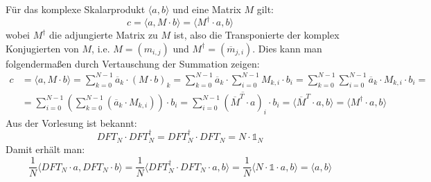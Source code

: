 \begin{flushenum}
	\item Für das komplexe Skalarprodukt $\langle a, b\rangle$ und eine
	Matrix $M$ gilt:
	\[ c = \langle a, M \cdot b\rangle = \langle M^\dagger \cdot a, b\rangle \]
	wobei $M^\dagger$ die adjungierte Matrix zu $M$ ist, also die Transponierte der komplex Konjugierten von $M$,
	i.e. $M = (m_{i,j})$ und $M^\dagger = (\overline{m}_{j,i})$.
	Dies kann man folgendermaßen durch Vertauschung der Summation zeigen:
	\begin{equation*}
	\begin{split}
	c &= \langle a, M \cdot b\rangle = \sum_{k=0}^{N-1} \overline{a}_k \cdot \left( M \cdot b \right)_k =
	\sum_{k=0}^{N-1} \overline{a}_k \cdot \sum_{i=0}^{N-1} M_{k,i} \cdot b_i =
	\sum_{k=0}^{N-1} \sum_{i=0}^{N-1} \overline{a}_k \cdot M_{k,i} \cdot b_i = \\
	&= \sum_{i=0}^{N-1} \left( \sum_{k=0}^{N-1} \left( \overline{a}_k \cdot M_{k,i}\right) \right) \cdot b_i =
	\sum_{i=0}^{N-1} \overline{\left( \overline{M}^T \cdot a \right)}_i
	\cdot b_i = \langle\overline{M}^T \cdot a, b\rangle = \langle M^\dagger
	\cdot a, b\rangle
	\end{split}
	\end{equation*}
	Aus der Vorlesung ist bekannt: 
	\[ DFT_N \cdot DFT_N^\dagger = DFT_N^\dagger \cdot DFT_N = N \cdot \mathds{1}_N \]
	Damit erhält man:
	\[ \frac{1}{N} \langle DFT_N \cdot a, DFT_N \cdot b\rangle =
	\frac{1}{N} \langle DFT_N^\dagger \cdot DFT_N \cdot a, b \rangle =
	\frac{1}{N} \langle N \cdot \mathds{1}\cdot a, b\rangle = \langle a, b\rangle \]
\end{flushenum}
